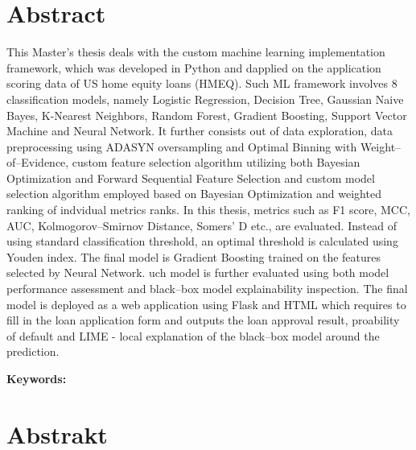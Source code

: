 \section*{Abstract}


This Master's thesis deals with the custom machine learning implementation framework, which was developed in Python and dapplied on the application scoring data of US home equity loans (HMEQ).
Such ML framework involves 8 classification models, namely Logistic Regression, Decision Tree, Gaussian Naive Bayes, K-Nearest Neighbors, Random Forest, Gradient Boosting, Support Vector Machine and Neural Network.
It further consists out of data exploration, data preprocessing using ADASYN oversampling and Optimal Binning with Weight--of--Evidence, custom feature selection algorithm utilizing both Bayesian Optimization and Forward Sequential Feature Selection and custom model selection algorithm employed based on Bayesian Optimization and weighted ranking of indvidual metrics ranks. In this thesis, metrics such as F1 score, MCC, AUC, Kolmogorov--Smirnov Distance, Somers' D etc., are evaluated.
Instead of using standard classification threshold, an optimal threshold is calculated using Youden index.
The final model is Gradient Boosting trained on the features selected by Neural Network. 
uch model is further evaluated using both model performance assessment and black--box model explainability inspection.
The final model is deployed as a web application using Flask and HTML which requires to fill in the loan application form and outputs the loan approval result, proability of default and LIME - local explanation of the black--box model around the prediction.
\bigskip

\textbf{Keywords:} \Keywords


\bigskip

\newpage
\section*{Abstrakt}\label{abstract}


